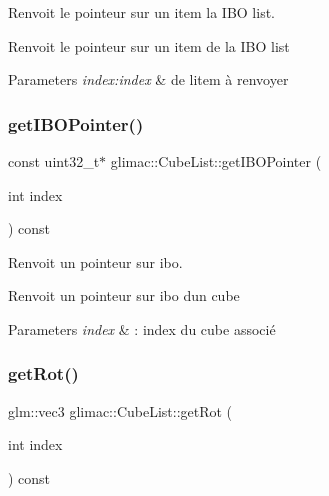 Renvoit le pointeur sur un item la I\+BO list. 

Renvoit le pointeur sur un item de la I\+BO list


\begin{DoxyParams}{Parameters}
{\em index\+:index} & de l\textquotesingle{}item à renvoyer \\
\hline
\end{DoxyParams}
\mbox{\label{classglimac_1_1CubeList_af52e02f29a9b4a13418cf4e90eec2562}} 
\subsubsection{\texorpdfstring{get\+I\+B\+O\+Pointer()}{getIBOPointer()}}
{\footnotesize\ttfamily const uint32\+\_\+t$\ast$ glimac\+::\+Cube\+List\+::get\+I\+B\+O\+Pointer (\begin{DoxyParamCaption}\item[{int}]{index }\end{DoxyParamCaption}) const\hspace{0.3cm}{\ttfamily [inline]}}



Renvoit un pointeur sur ibo. 

Renvoit un pointeur sur ibo d\textquotesingle{}un cube


\begin{DoxyParams}{Parameters}
{\em index} & \+: index du cube associé \\
\hline
\end{DoxyParams}
\mbox{\label{classglimac_1_1CubeList_a539399f61db27107ad39520c790467c0}} 
\subsubsection{\texorpdfstring{get\+Rot()}{getRot()}}
{\footnotesize\ttfamily glm\+::vec3 glimac\+::\+Cube\+List\+::get\+Rot (\begin{DoxyParamCaption}\item[{int}]{index }\end{DoxyParamCaption}) const\hspace{0.3cm}{\ttfamily [inline]}}



